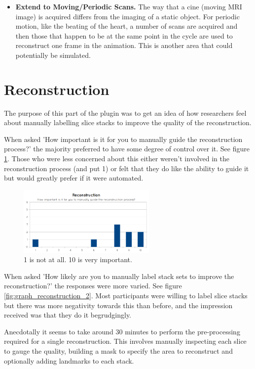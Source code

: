\begin{itemize}
  \item \textbf{Extend to Moving/Periodic Scans.} The way that a cine (moving MRI image) is acquired differs from the imaging of a static object. For periodic motion, like the beating of the heart, a number of scans are acquired and then those that happen to be at the same point in the cycle are used to reconstruct one frame in the animation. This is another area that could potentially be simulated.
\end{itemize}

\newpage
\section{Reconstruction}
The purpose of this part of the plugin was to get an idea of how researchers feel about manually labelling slice stacks to improve the quality of the reconstruction. 

When asked 'How important is it for you to manually guide the reconstruction process?' the majority preferred to have some degree of control over it. See figure \ref{fig:graph_reconstruction_1}. Those who were less concerned about this either weren't involved in the reconstruction process (and put 1) or felt that they do like the ability to guide it but would greatly prefer if it were automated.

\begin{figure}[h]
    \centering
  \includegraphics[width=0.6\textwidth]{images/evaluation/graph_reconstruction_1.png}
    \caption{1 is not at all. 10 is very important.}\label{fig:graph_reconstruction_1}
\end{figure}

When asked 'How likely are you to manually label stack sets to improve the reconstruction?' the responses were more varied. See figure \ref{fig:graph_reconstruction_2}. Most participants were willing to label slice stacks but there was more negativity towards this than before, and the impression received was that they do it begrudgingly.

Anecdotally it seems to take around 30 minutes to perform the pre-processing required for a single reconstruction. This involves manually inspecting each slice to gauge the quality, building a mask to specify the area to reconstruct and optionally adding landmarks to each stack.

